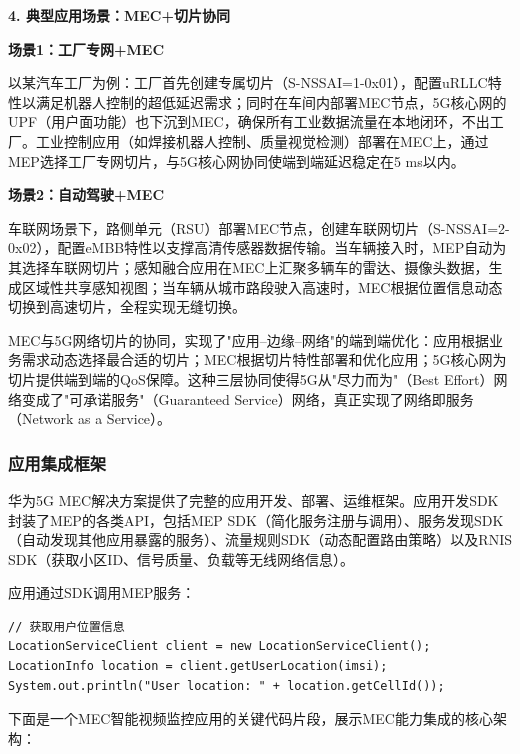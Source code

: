 \textbf{4. 典型应用场景：MEC+切片协同}

\textbf{场景1：工厂专网+MEC}

以某汽车工厂为例：工厂首先创建专属切片（S-NSSAI=1-0x01），配置uRLLC特性以满足机器人控制的超低延迟需求；同时在车间内部署MEC节点，5G核心网的UPF（用户面功能）也下沉到MEC，确保所有工业数据流量在本地闭环，不出工厂。工业控制应用（如焊接机器人控制、质量视觉检测）部署在MEC上，通过MEP选择工厂专网切片，与5G核心网协同使端到端延迟稳定在5 ms以内。

\textbf{场景2：自动驾驶+MEC}

车联网场景下，路侧单元（RSU）部署MEC节点，创建车联网切片（S-NSSAI=2-0x02），配置eMBB特性以支撑高清传感器数据传输。当车辆接入时，MEP自动为其选择车联网切片；感知融合应用在MEC上汇聚多辆车的雷达、摄像头数据，生成区域性共享感知视图；当车辆从城市路段驶入高速时，MEC根据位置信息动态切换到高速切片，全程实现无缝切换。

\begin{insightbox}[MEC与切片的协同价值]
MEC与5G网络切片的协同，实现了"应用--边缘--网络"的端到端优化：应用根据业务需求动态选择最合适的切片；MEC根据切片特性部署和优化应用；5G核心网为切片提供端到端的QoS保障。这种三层协同使得5G从"尽力而为"（Best Effort）网络变成了"可承诺服务"（Guaranteed Service）网络，真正实现了网络即服务（Network as a Service）。
\end{insightbox}

\subsubsection{应用集成框架}

华为5G MEC解决方案提供了完整的应用开发、部署、运维框架。应用开发SDK封装了MEP的各类API，包括MEP SDK（简化服务注册与调用）、服务发现SDK（自动发现其他应用暴露的服务）、流量规则SDK（动态配置路由策略）以及RNIS SDK（获取小区ID、信号质量、负载等无线网络信息）。

应用通过SDK调用MEP服务：

\begin{verbatim}
// 获取用户位置信息
LocationServiceClient client = new LocationServiceClient();
LocationInfo location = client.getUserLocation(imsi);
System.out.println("User location: " + location.getCellId());
\end{verbatim}

下面是一个MEC智能视频监控应用的关键代码片段，展示MEC能力集成的核心架构：

